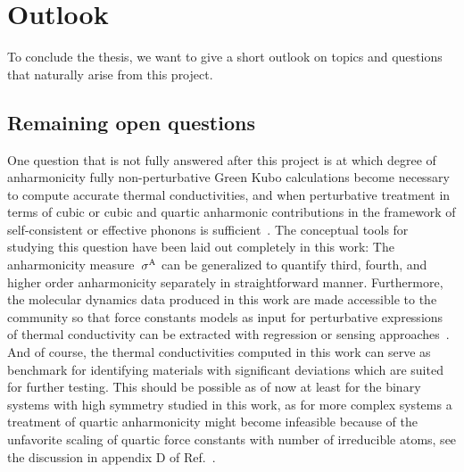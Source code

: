 
\section{Outlook}
To conclude the thesis, we want to give a short outlook on topics and questions that naturally arise from this project.


\subsection{Remaining open questions}
\label{sec:outlook.open_questions}
One question that is not fully answered after this project is at which degree of anharmonicity fully non-perturbative Green Kubo calculations become necessary to compute accurate thermal conductivities, and when perturbative treatment in terms of cubic or cubic and quartic anharmonic contributions in the framework of self-consistent or effective phonons is sufficient~\cite{Hellman2013b,Feng2016,Tadano2018,Xia2018,Ravichandran2018}. The conceptual tools for studying this question have been laid out completely in this work: The anharmonicity measure~$\sigma^\mathrm{A}$ can be generalized to quantify third, fourth, and higher order anharmonicity separately in straightforward manner. Furthermore, the molecular dynamics data produced in this work are made accessible to the community so that force constants models as input for perturbative expressions of thermal conductivity can be extracted with regression or sensing approaches~\cite{Zhou2014,Fransson2020}. And of course, the thermal conductivities computed in this work can serve as benchmark for identifying materials with significant deviations which are suited for further testing. This should be possible as of now at least for the binary systems with high symmetry studied in this work, as for more complex systems a treatment of quartic anharmonicity might become infeasible because of the unfavorite scaling of quartic force constants with number of irreducible atoms, see the discussion in appendix D of Ref.~\cite{Ravichandran2018}.

